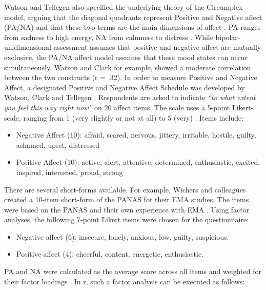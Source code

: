 \documentclass[]{book}
\providecommand{\tightlist}{%
  \setlength{\itemsep}{0pt}\setlength{\parskip}{0pt}}
\begin{document}
Watson and Tellegen \citep{watson1985} also specified the underlying
theory of the Circumplex model, arguing that the diagonal quadrants
represent Positive and Negative affect (PA/NA) and that these two terms
are the main dimensions of affect \citep{Watson1999}. PA ranges from
sadness to high energy, NA from calmness to distress \citep{Watson1988}.
While bipolar-unidimensional assessment assumes that positive and
negative affect are mutually exclusive, the PA/NA affect model assumes
that these mood states can occur simultaneously. Watson and Clark
\citep{Watson1997} for example, showed a moderate correlation between
the two constructs (r = .32). In order to measure Positive and Negative
Affect, a designated Positive and Negative Affect Schedule was developed
by Watson, Clark and Tellegen \citep{Watson1988}. Respondents are asked
to indicate \emph{``to what extent you feel this way right now''} on 20
affect items. The scale uses a 5-point Likert-scale, ranging from 1
(very slightly or not at all) to 5 (very) \citep{Watson1999}. Items
include:

\begin{itemize}
\tightlist
\item
  Negative Affect (10): afraid, scared, nervous, jittery, irritable,
  hostile, guilty, ashamed, upset, distressed
\item
  Positive Affect (10): active, alert, attentive, determined,
  enthusiastic, excited, inspired, interested, proud, strong
\end{itemize}

There are several short-forms available. For example, Wichers and
colleagues created a 10-item short-form of the PANAS for their EMA
studies. The items were based on the PANAS and their own experience with
EMA \citep{Wichers2012}. Using factor analyses, the following 7-point
Likert items were chosen for the questionnaire:

\begin{itemize}
\tightlist
\item
  Negative affect (6): insecure, lonely, anxious, low, guilty,
  suspicious.
\item
  Positive affect (4): cheerful, content, energetic, enthusiastic.
\end{itemize}

PA and NA were calculated as the average score across all items and
weighted for their factor loadings \citep{Wichers2012}. In r, such a
factor analysis can be executed as follows:
\end{document}
